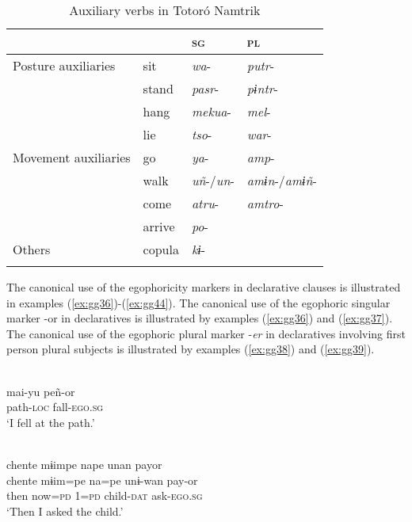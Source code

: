 \documentclass[output=paper]{langsci/langscibook}
\begin{document}
\begin{table}
\begin{tabularx}{.8\textwidth}{XXXl}
\lsptoprule
 &  & \textsc{sg} & \textsc{pl}\\
\midrule
Posture auxiliaries & sit & \textit{wa}- & \textit{putr}-\\
& stand & \textit{pasr}- & \textit{pɨntr}-\\
& hang & \textit{mekua}- & \textit{mel}-\\
& lie & \textit{tso}- & \textit{war}-\\
\hline
Movement auxiliaries & go & \textit{ya}- & \textit{amp}-\\
& walk & \textit{uñ}-/\textit{un}- & \textit{amɨn}-/\textit{amɨñ}-\\
& come & \textit{atru}- & \textit{amtro}-\\
& arrive & \textit{po}- & \\
\hline
Others & copula & \textit{kɨ}- & \\
\lspbottomrule
\end{tabularx}
\caption{Auxiliary verbs in Totoró Namtrik}
\label{tab:gg8}
\end{table}


The canonical use of the egophoricity markers in declarative clauses is illustrated in examples (\ref{ex:gg36})-(\ref{ex:gg44}). The canonical use of the egophoric singular marker -or in declaratives is illustrated by examples (\ref{ex:gg36}) and (\ref{ex:gg37}). The canonical use of the egophoric plural marker -\textit{er} in declaratives involving first person plural subjects is illustrated by examples (\ref{ex:gg38}) and (\ref{ex:gg39}).


\ea \label{ex:gg36}
\\
    \gll mai-yu	peñ-or\\
         path-\textsc{loc} fall-\textsc{ego.sg}\\
    \glt ‘I fell at the path.'
\z

\ea \label{ex:gg37}
\\
    \glll chente	mɨimpe	nape	unan	payor\\
    chente	mɨim=pe	na=pe	unɨ-wan	pay-or\\
         then	now=\textsc{pd}	1=\textsc{pd}	child-\textsc{dat} 	ask-\textsc{ego.sg}\\
    \glt ‘Then I asked the child.'
\z
\end{document}
